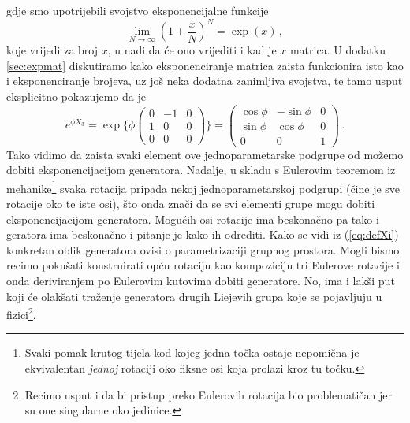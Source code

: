gdje smo upotrijebili svojstvo eksponencijalne funkcije
\begin{equation}
    \lim_{N\to\infty}\left(1 + \frac{x}{N}\right)^N = \exp(x) \,,
\end{equation}
koje vrijedi za broj $x$,
u nadi da će ono vrijediti i kad je $x$ matrica.
U dodatku \ref{sec:expmat} diskutiramo
kako eksponenciranje matrica zaista funkcionira isto kao i
eksponenciranje brojeva, uz još neka dodatna zanimljiva svojstva,
te tamo usput eksplicitno pokazujemo da je
\begin{equation}
e^{\phi X_3} = \exp\Bigg\{ 
    \phi  \begin{pmatrix}
0 & -1 & 0 \\
1 & 0 & 0 \\
0 & 0 & 0 
\end{pmatrix}\Bigg\} =
\begin{pmatrix}
\cos\phi & -\sin\phi & 0 \\
\sin\phi & \cos\phi & 0 \\
0 & 0 & 1 \end{pmatrix} \,.
\end{equation}
Tako vidimo da zaista svaki element ove jednoparametarske podgrupe
od  možemo dobiti eksponencijacijom generatora.
Nadalje, u skladu s Eulerovim teoremom iz mehanike\footnote{Svaki pomak krutog
tijela kod kojeg jedna točka ostaje nepomična je ekvivalentan \emph{jednoj}
rotaciji oko fiksne osi koja prolazi kroz tu točku.} svaka  rotacija 
pripada nekoj jednoparametarskoj podgrupi
 (čine je sve rotacije oko te iste osi), što onda znači da se
svi elementi grupe  mogu dobiti eksponencijacijom generatora.
Mogućih osi rotacije ima beskonačno pa tako i geratora ima beskonačno
i pitanje je kako ih odrediti.
Kako se vidi iz (\ref{eq:defXi}) konkretan oblik generatora ovisi
o parametrizaciji grupnog prostora. 
Mogli bismo recimo pokušati konstruirati opću rotaciju kao kompoziciju tri
 Eulerove rotacije i onda deriviranjem po Eulerovim kutovima dobiti
 generatore. No, ima i lakši put koji će olakšati traženje 
 generatora drugih Liejevih grupa koje se pojavljuju u fizici\footnote{Recimo
     usput i da bi pristup preko Eulerovih rotacija
     bio  problematičan jer su one singularne oko jedinice.}.

